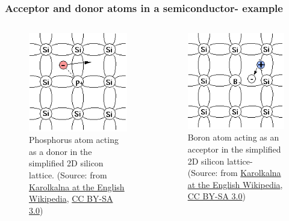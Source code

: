\begin{frame}
	\frametitle{Acceptor and donor atoms in a semiconductor- example}
    \begin{columns}
        \begin{column}{0.5\textwidth}
            \begin{figure}
                \centering
                \includegraphics[scale=0.5]{fig/lec02/Donor_in_Si_lattice.png}
                \caption{Phosphorus atom acting as a donor in the simplified 2D silicon lattice. (Source: from \href{https://commons.wikimedia.org/wiki/File:Donor_in_Si_lattice.png}{Karolkalna at the English Wikipedia}, \href{http://creativecommons.org/licenses/by-sa/3.0/}{CC BY-SA 3.0})}
            \end{figure}
    \end{column}
    \hfill
    \begin{column}{0.5\textwidth}
        \begin{figure}
            \centering
            \includegraphics[scale=0.5]{fig/lec02/Acceptor_in_Si_lattice.png}
            \caption{Boron atom acting as an acceptor in the simplified 2D silicon lattice- (Source: from \href{https://commons.wikimedia.org/wiki/File:Acceptor_in_Si_lattice.png}{Karolkalna at the English Wikipedia}, \href{http://creativecommons.org/licenses/by-sa/3.0/}{CC BY-SA 3.0})}
        \end{figure}
    \end{column}
    \end{columns}
\end{frame}

